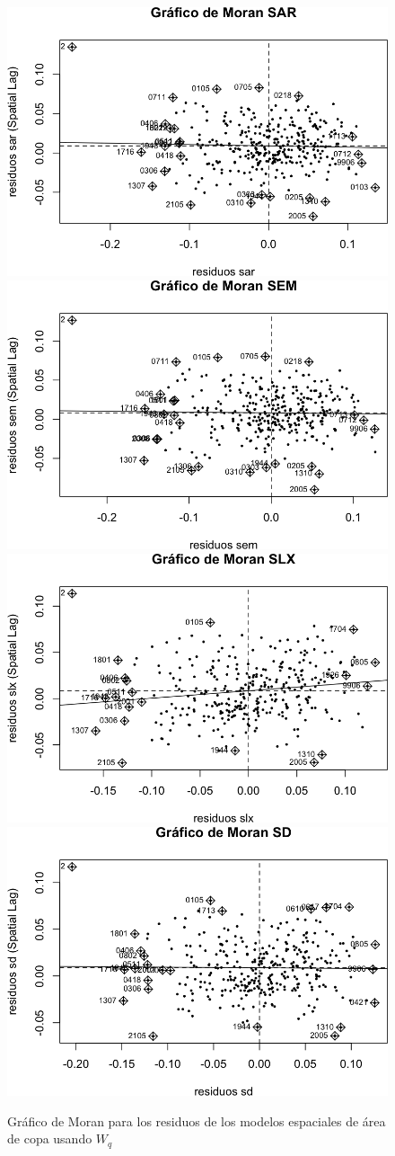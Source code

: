 \documentclass[12pt,]{book}
\begin{document}
\begin{figure}
\includegraphics[width=0.49\linewidth]{tesis-unigis_files/figure-latex/moranplot-resmodel-all-wq-1} \includegraphics[width=0.49\linewidth]{tesis-unigis_files/figure-latex/moranplot-resmodel-all-wq-2} \includegraphics[width=0.49\linewidth]{tesis-unigis_files/figure-latex/moranplot-resmodel-all-wq-3} \includegraphics[width=0.49\linewidth]{tesis-unigis_files/figure-latex/moranplot-resmodel-all-wq-4} \caption{Gráfico de Moran para los residuos de los modelos espaciales de área de copa usando $W_{q}$}\label{fig:moranplot-resmodel-all-wq}
\end{figure}
\end{document}
